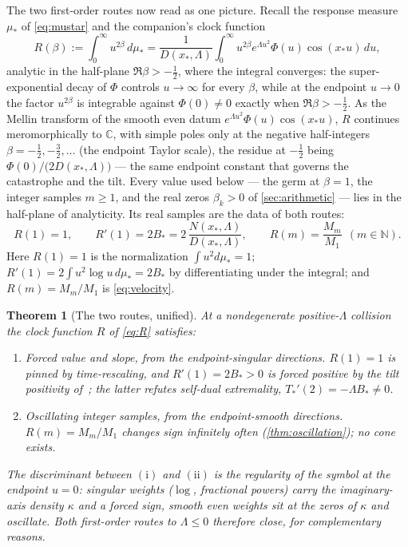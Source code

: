 \documentclass[11pt,reqno]{amsart}
\theoremstyle{plain}
\newtheorem{theorem}{Theorem}[section]
\theoremstyle{definition}
\theoremstyle{remark}
\newcommand{\C}{\mathbb C}
\newcommand{\N}{\mathbb N}
\begin{document}
The two first-order routes now read as one picture. Recall the response
measure $\mu_*$ of \eqref{eq:mustar} and the companion's clock function
\begin{equation}\label{eq:R}
  R(\beta):=\int_0^\infty u^{2\beta}\,d\mu_*
  =\frac{1}{D(x_*,\Lambda)}\int_0^\infty u^{2\beta}e^{\Lambda u^2}
   \Phi(u)\cos(x_*u)\,du,
\end{equation}
analytic in the half-plane $\Re\beta>-\tfrac12$, where the integral
converges: the super-exponential decay of $\Phi$ controls $u\to\infty$ for
every $\beta$, while at the endpoint $u\to0$ the factor $u^{2\beta}$ is
integrable against $\Phi(0)\neq0$ exactly when $\Re\beta>-\tfrac12$. As the
Mellin transform of the smooth even datum $e^{\Lambda u^2}\Phi(u)\cos(x_*u)$,
$R$ continues meromorphically to $\C$, with simple poles only at the
negative half-integers $\beta=-\tfrac12,-\tfrac32,\dots$ (the endpoint Taylor
scale), the residue at $-\tfrac12$ being $\Phi(0)/\bigl(2D(x_*,\Lambda)\bigr)$
--- the same endpoint constant that governs the catastrophe and the tilt.
Every value used below --- the germ at $\beta=1$, the integer samples
$m\ge1$, and the real zeros $\beta_k>0$ of \cref{sec:arithmetic} --- lies in
the half-plane of analyticity.
Its real samples are the data of both routes:
\begin{equation}\label{eq:samples}
  R(1)=1,\qquad
  R'(1)=2B_*=2\,\frac{N(x_*,\Lambda)}{D(x_*,\Lambda)},\qquad
  R(m)=\frac{M_m}{M_1}\ \ (m\in\N).
\end{equation}
Here $R(1)=1$ is the normalization $\int u^2d\mu_*=1$; $R'(1)=2\int u^2\log
u\,d\mu_*=2B_*$ by differentiating under the integral; and $R(m)=M_m/M_1$ is
\eqref{eq:velocity}.

\begin{theorem}[The two routes, unified]\label{thm:unified}
At a nondegenerate positive-$\Lambda$ collision the clock function $R$ of
\eqref{eq:R} satisfies:
\begin{enumerate}
\item[$(\mathrm i)$] \emph{Forced value and slope, from the
endpoint-singular directions.} $R(1)=1$ is pinned by time-rescaling, and
$R'(1)=2B_*>0$ is forced positive by the tilt positivity of~\cite{Fsymbol};
the latter refutes self-dual extremality, $T_*'(2)=-\Lambda B_*\neq0$.
\item[$(\mathrm{ii})$] \emph{Oscillating integer samples, from the
endpoint-smooth directions.} $R(m)=M_m/M_1$ changes sign infinitely often
(\cref{thm:oscillation}); no cone exists.
\end{enumerate}
The discriminant between $(\mathrm i)$ and $(\mathrm{ii})$ is the regularity
of the symbol at the endpoint $u=0$: singular weights ($\log$, fractional
powers) carry the imaginary-axis density $\kappa$ and a forced sign, smooth
even weights sit at the zeros of $\kappa$ and oscillate. Both first-order
routes to $\Lambda\le0$ therefore close, for complementary reasons.
\end{theorem}
\end{document}
